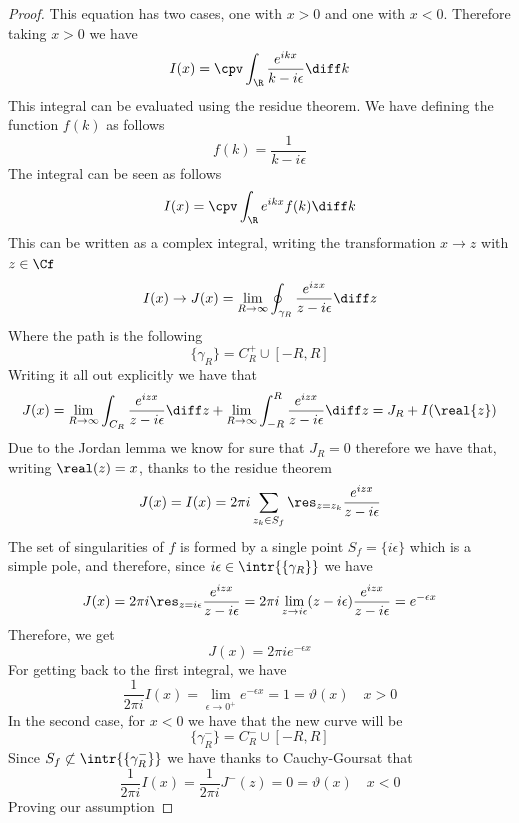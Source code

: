 \documentclass[../mmf.tex]{subfiles}
\begin{document}
\begin{proof}
	This equation has two cases, one with $x>0$ and one with $x<0$. Therefore taking $x>0$ we have
	\begin{equation*}
		I(x)=\cpv\int_{\R}^{}\frac{e^{ikx}}{k-i\epsilon}\diff k
	\end{equation*}
	This integral can be evaluated using the residue theorem. We have defining the function $f(k)$ as follows
	\begin{equation*}
		f(k)=\frac{1}{k-i\epsilon}
	\end{equation*}
	The integral can be seen as follows
	\begin{equation*}
		I(x)=\cpv\int_{\R}^{}e^{ikx}f(k)\diff k
	\end{equation*}
	This can be written as a complex integral, writing the transformation $x\to z$ with $z\in\Cf$
	\begin{equation*}
		I(x)\to J(x)=\lim_{R\to\infty}\oint_{\gamma_R}\frac{e^{izx}}{z-i\epsilon}\diff z
	\end{equation*}
	Where the path is the following
	\begin{equation*}
		\{\gamma_R\}=C_R^+\cup[-R,R]
	\end{equation*}
	Writing it all out explicitly we have that
	\begin{equation*}
		J(x)=\lim_{R\to\infty}\int_{C_R}\frac{e^{izx}}{z-i\epsilon}\diff z+\lim_{R\to\infty}\int_{-R}^{R}\frac{e^{izx}}{z-i\epsilon}\diff z=J_R+I(\real{z})
	\end{equation*}
	Due to the Jordan lemma we know for sure that $J_R=0$ therefore we have that, writing $\real(z)=x$, thanks to the residue theorem
	\begin{equation*}
		J(x)=I(x)=2\pi i\sum_{z_k\in S_f}\res_{z=z_k}\frac{e^{izx}}{z-i\epsilon}
	\end{equation*}
	The set of singularities of $f$ is formed by a single point $S_f=\{i\epsilon\}$ which is a simple pole, and therefore, since $i\epsilon\in\intr{\{\gamma_R\}}$ we have
	\begin{equation*}
		J(x)=2\pi i\res_{z=i\epsilon}\frac{e^{izx}}{z-i\epsilon}=2\pi i\lim_{z\to i\epsilon}(z-i\epsilon)\frac{e^{izx}}{z-i\epsilon}=e^{-\epsilon x}
	\end{equation*}
	Therefore, we get
	\begin{equation*}
		J(x)=2\pi ie^{-\epsilon x}
	\end{equation*}
	For getting back to the first integral, we have
	\begin{equation*}
		\frac{1}{2\pi i}I(x)=\lim_{\epsilon\to0^+}e^{-\epsilon x}=1=\vartheta(x)\quad x>0
	\end{equation*}
	In the second case, for $x<0$ we have that the new curve will be
	\begin{equation*}
		\{\gamma_R^-\}=C_R^-\cup[-R,R]
	\end{equation*}
	Since $S_f\not\subset\intr{\{\gamma_R^-\}}$ we have thanks to Cauchy-Goursat that
	\begin{equation*}
		\frac{1}{2\pi i}I(x)=\frac{1}{2\pi i}J^-(z)=0=\vartheta(x)\quad x<0
	\end{equation*}
	Proving our assumption
\end{proof}
\end{document}
